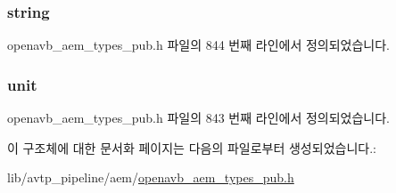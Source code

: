 \subsubsection[{\texorpdfstring{string}{string}}]{ string}\hypertarget{structopenavb__aem__control__value__format__control__linear__uint64__t_a1f81001cefa769cb3651172fd5ab0748}{}\label{structopenavb__aem__control__value__format__control__linear__uint64__t_a1f81001cefa769cb3651172fd5ab0748}


openavb\+\_\+aem\+\_\+types\+\_\+pub.\+h 파일의 844 번째 라인에서 정의되었습니다.

\subsubsection[{\texorpdfstring{unit}{unit}}]{ unit}\hypertarget{structopenavb__aem__control__value__format__control__linear__uint64__t_a0b3ff376c10369016824076deacc055e}{}\label{structopenavb__aem__control__value__format__control__linear__uint64__t_a0b3ff376c10369016824076deacc055e}


openavb\+\_\+aem\+\_\+types\+\_\+pub.\+h 파일의 843 번째 라인에서 정의되었습니다.



이 구조체에 대한 문서화 페이지는 다음의 파일로부터 생성되었습니다.\+:\begin{DoxyCompactItemize}
\item 
lib/avtp\+\_\+pipeline/aem/\hyperlink{openavb__aem__types__pub_8h}{openavb\+\_\+aem\+\_\+types\+\_\+pub.\+h}\end{DoxyCompactItemize}
